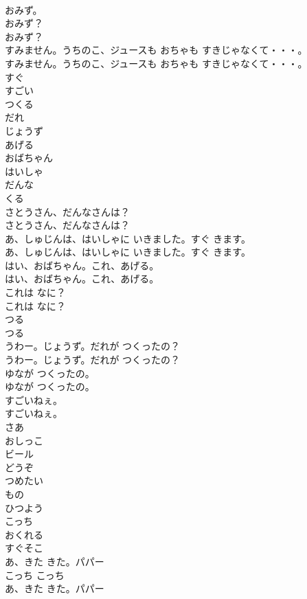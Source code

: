 \documentclass[8pt]{extreport}
\begin{document}
\begin{CJK}{UTF8}{min}
\\	おみず。
\\	おみず？
\\	おみず？
\\	すみません。うちのこ、ジュースも おちゃも すきじゃなくて・・・。
\\	すみません。うちのこ、ジュースも おちゃも すきじゃなくて・・・。
\\	すぐ
\\	すごい
\\	つくる
\\	だれ
\\	じょうず
\\	あげる
\\	おばちゃん
\\	はいしゃ
\\	だんな
\\	くる
\\	さとうさん、だんなさんは？
\\	さとうさん、だんなさんは？
\\	あ、しゅじんは、はいしゃに いきました。すぐ きます。
\\	あ、しゅじんは、はいしゃに いきました。すぐ きます。
\\	はい、おばちゃん。これ、あげる。
\\	はい、おばちゃん。これ、あげる。
\\	これは なに？
\\	これは なに？
\\	つる
\\	つる
\\	うわー。じょうず。だれが つくったの？
\\	うわー。じょうず。だれが つくったの？
\\	ゆなが つくったの。
\\	ゆなが つくったの。
\\	すごいねぇ。
\\	すごいねぇ。
\\	さあ
\\	おしっこ
\\	ビール
\\	どうぞ
\\	つめたい
\\	もの
\\	ひつよう
\\	こっち
\\	おくれる
\\	すぐそこ
\\	あ、きた きた。パパー
\\	こっち こっち
\\	あ、きた きた。パパー

\end{CJK}
\end{document}
